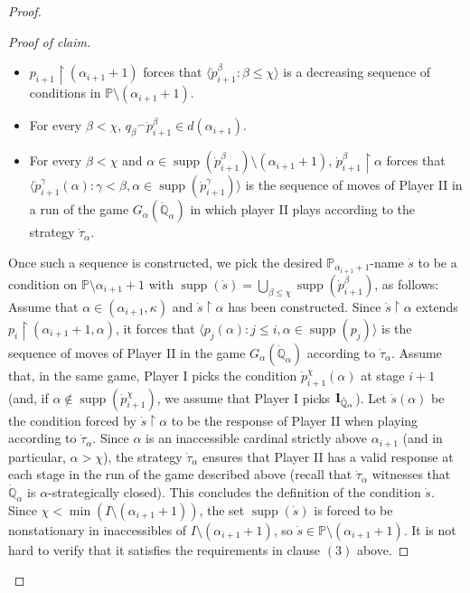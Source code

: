 \documentclass[11pt]{amsart}
\renewcommand{\restriction}{\mathbin\upharpoonright}    %
\theoremstyle{definition}
\newcounter{condition}
\theoremstyle{remark}
\newcommand\<{{<}}
\DeclareMathOperator{\supp}{supp}
\newcommand{\one}{\mathop{1\hskip-3pt {\rm l}}}
\newcommand{\po}{\mathbb{P}}
\newcommand{\qo}{\mathbb{Q}}
\newcommand{\la}{\langle}
\newcommand{\ra}{\rangle}
\begin{document}
\begin{proof}
\begin{proof}[Proof of claim]
   \begin{itemize}
       \item $p_{i+1}\restriction (\alpha_{i+1}+1)$ forces that $\la \dot{p}^\beta_{i+1} \colon \beta\leq\chi \ra$ is a decreasing sequence of conditions in $\mathbb{P}\setminus (\alpha_{i+1}+1).$
       \item For every $\beta<\chi$, ${q_\beta}^{\frown} \dot{p}^{\beta}_{i+1}\in d(\alpha_{i+1})$.
       \item For every $\beta<\chi$ and $\alpha\in \supp(\dot{p}^\beta_{i+1})\setminus (\alpha_{i+1}+1)$, $\dot{p}^{\beta}_{i+1}\restriction \alpha$ forces that $\la \dot{p}^\gamma_{i+1}(\alpha) \colon \gamma<\beta, \alpha\in \supp(\dot{p}^\gamma_{i+1}) \ra$ is the sequence of moves of Player II in a run of the game $G_\alpha(\dot{\qo}_\alpha)$ in which player II plays according to the strategy $\dot{\tau}_\alpha$. 
   \end{itemize}
   Once such a sequence is constructed, we pick the desired $\po_{\alpha_{i+1}+1}$-name $\dot{s}$ to be a condition on $\po\setminus \alpha_{i+1}+1$ with $\supp(\dot{s}) = \bigcup_{\beta\leq \chi} \supp(\dot{p}^\beta_{i+1})$, as follows: Assume that $\alpha\in (\alpha_{i+1}, \kappa)$ and $\dot{s}\restriction \alpha$ has been constructed. Since $\dot{s}\restriction \alpha$ extends ${p}_{i}\restriction (\alpha_{i+1}+1,\alpha)$, it forces that $\la p_{j}(\alpha) \colon j\leq i, \alpha\in \supp(p_j)\ra$ is the sequence of moves of Player II in the game $G_\alpha(\dot{\qo}_\alpha)$ according to $\dot{\tau}_\alpha$. Assume that, in the same game, Player I picks the condition $\dot{p}^\chi_{i+1}(\alpha)$ at stage $i+1$ (and, if $\alpha\notin \supp(\dot{p}^\chi_{i+1})$, we assume that Player I picks $\one_{\dot{\qo}_\alpha}$). Let $\dot{s}(\alpha)$ be the condition forced by $\dot{s}\restriction \alpha$ to be the response of Player II when playing according to $\dot{\tau}_\alpha$. Since $\alpha$ is an inaccessible cardinal strictly above $\alpha_{i+1}$ (and in particular,  $\alpha>\chi$), the strategy $\dot{\tau}_\alpha$ ensures that Player II has a valid response at each stage in the run of the game described above (recall that $\dot{\tau}_\alpha$ witnesses that $\dot{\qo}_\alpha$ is $\alpha$-strategically closed). This concludes the definition of the condition $\dot{s}$. Since $\chi < \min(I\setminus (\alpha_{i+1}+1))$, the set $\supp(\dot{s})$ is forced to be nonstationary in inaccessibles of $I\setminus (\alpha_{i+1}+1)$, so $\dot{s}\in \po\setminus (\alpha_{i+1}+1)$. It is  not hard to verify that it satisfies the requirements in clause $(3)$ above. 
   

\end{proof}
\end{proof}
\end{document}

